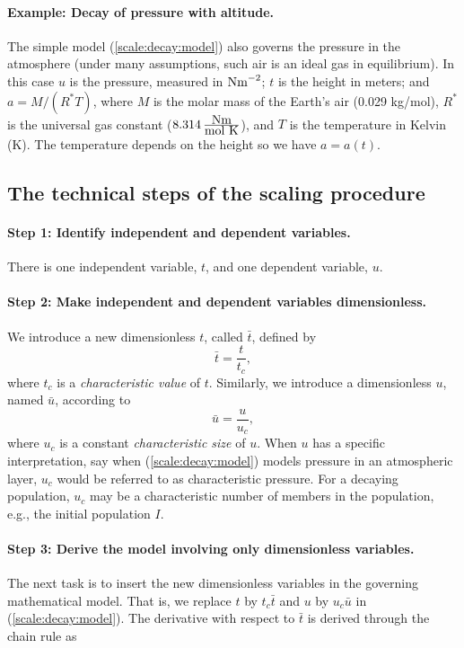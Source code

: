 \documentclass[graybox,envcountchap,sectrefs,final]{svmonodo}
\begin{document}
\paragraph{Example: Decay of pressure with altitude.}
The simple model (\ref{scale:decay:model}) also governs the pressure
in the atmosphere (under many assumptions, such air is an ideal gas in
equilibrium). In this case $u$ is the
pressure, measured in $\hbox{Nm}^{-2}$; $t$ is the height in meters;
and $a=M/(R^*T)$, where
$M$ is the molar mass of the Earth's air (0.029 kg/mol),
$R^*$ is the universal
gas constant ($8.314\,\frac{\hbox{Nm}}{\hbox{mol K}}$),
and $T$ is the temperature in Kelvin (K).
The temperature depends on the height so we have $a=a(t)$.


\subsection{The technical steps of the scaling procedure}
\label{sec:scale:decay:steps}

\paragraph{Step 1: Identify independent and dependent variables.}
There is one independent variable, $t$, and one dependent variable,
$u$.


\paragraph{Step 2: Make independent and dependent variables dimensionless.}
We introduce a new dimensionless $t$, called $\bar t$, defined by
\begin{equation}
\bar t = \frac{t}{t_c},
\end{equation}
where $t_c$ is a \emph{characteristic value} of $t$. Similarly,
we introduce a dimensionless $u$, named $\bar u$, according to
\begin{equation}
\bar u = \frac{u}{u_c},
\end{equation}
where $u_c$ is a constant \emph{characteristic size} of $u$. When $u$ has a specific
interpretation, say when (\ref{scale:decay:model}) models pressure
in an atmospheric layer, $u_c$ would be referred to as characteristic pressure.
For a decaying population, $u_c$ may be a characteristic number of
members in the population, e.g., the initial population $I$.

\paragraph{Step 3: Derive the model involving only dimensionless variables.}
The next task is to insert the new dimensionless variables in the
governing mathematical model. That is, we replace $t$ by $t_c\bar t$
and $u$ by $u_c\bar u$ in (\ref{scale:decay:model}). The derivative
with respect to $\bar t$ is derived through the chain rule as
\end{document}

